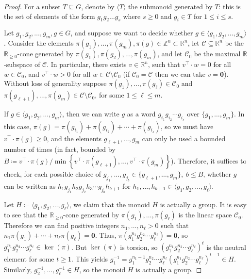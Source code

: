 \documentclass[a4paper,UKenglish,cleveref, autoref, thm-restate]{lipics-v2021}
\newcommand{\Z}{\mathbb{Z}}
\newcommand{\R}{\mathbb{R}}
\newcommand{\mC}{\mathcal{C}}
\newcommand{\bzer}{\boldsymbol{0}}
\newcommand{\gen}[1]{\langle {#1} \rangle}
\theoremstyle{definition}
\theoremstyle{definition}
\theoremstyle{definition}
\begin{document}
\begin{proof}
    For a subset $T \subseteq G$, denote by $\gen{T}$ the submonoid generated by $T$: this is the set of elements of the form $g_1 g_2 \dots g_s$ where $s \geq 0$ and $g_i \in T$ for $1 \leq i \leq s$.
    
    Let $g_1, g_2, \ldots, g_m, g \in G$, and suppose we want to decide whether $g \in \gen{g_1, g_2, \ldots, g_m}$.
    Consider the elements $\pi(g_1), \ldots, \pi(g_m), \pi(g) \in \Z^n \subset \R^n$, let $\mC \subseteq \R^n$ be the $\R_{\geq 0}$-cone generated by $\pi(g_1), \pi(g_2), \ldots, \pi(g_m)$, and let $\mC_0$ be the maximal $\R$-subspace of $\mC$.
    In particular, there exists $v \in \R^n$, such that $v^{\top} \cdot w = 0$ for all $w \in \mC_0$, and $v^{\top} \cdot w > 0$ for all $w \in \mC \setminus \mC_0$ (if $\mC_0 = \mC$ then we can take $v = \bzer$).
    Without loss of generality suppose $\pi(g_1) , \ldots, \pi(g_{\ell}) \in \mC_0$ and $\pi(g_{\ell + 1}) , \ldots, \pi(g_{m}) \in \mC \setminus \mC_0$, for some $1 \leq \ell \leq m$.

    If $g \in \gen{g_1, g_2, \ldots, g_m}$, then we can write $g$ as a word $g_{i_1} g_{i_2} \cdots g_{i_s}$ over $\{g_1, \ldots, g_m\}$. 
    In this case, $\pi(g) = \pi(g_{i_1}) + \pi(g_{i_2}) + \cdots + \pi(g_{i_s})$, so we must have $v^{\top} \cdot \pi(g) \geq 0$, and the elements $g_{\ell + 1}, \ldots, g_m$ can only be used a bounded number of times (in fact, bounded by $B \coloneqq v^{\top} \cdot \pi(g)/ \min\left\{v^{\top} \cdot \pi(g_{\ell + 1}), \ldots, v^{\top} \cdot \pi(g_{m})\right\}$).
    Therefore, it suffices to check, for each possible choice of $g_{j_1}, \ldots, g_{j_b} \in \{g_{\ell + 1}, \ldots, g_m\}, \; b \leq B$, whether $g$ can be written as $h_1 g_{j_1} h_2 g_{j_2} h_3 \cdots g_{j_b} h_{b+1}$ for $h_1, \ldots, h_{b+1} \in \gen{g_1, g_2, \ldots, g_{\ell}}$.
    
    Let $H \coloneqq \gen{g_1, g_2, \ldots, g_{\ell}}$, we claim that the monoid $H$ is actually a group. 
    It is easy to see that the $\R_{\geq 0}$-cone generated by $\pi(g_1) , \ldots, \pi(g_{\ell})$ is the linear space $\mC_0$.
    Therefore we can find positive integers $n_1, \ldots, n_{\ell} > 0$ such that $n_1 \pi(g_1) + \cdots + n_{\ell} \pi(g_{\ell}) = \bzer$. Thus, $\pi(g_1^{n_1} g_2^{n_2} \cdots g_{\ell}^{n_{\ell}}) = \bzer$, so $g_1^{n_1} g_2^{n_2} \cdots g_{\ell}^{n_{\ell}} \in \ker(\pi)$.
    But $\ker(\pi)$ is torsion, so $\left( g_1^{n_1} g_2^{n_2} \cdots g_{\ell}^{n_{\ell}} \right)^t$ is the neutral element for some $t \geq 1$.
    This yields $g_1^{-1} = g_1^{n_1 - 1} g_2^{n_2} \cdots g_{\ell}^{n_{\ell}} \left( g_1^{n_1} g_2^{n_2} \cdots g_{\ell}^{n_{\ell}} \right)^{t-1} \in H$.
    Similarly, $g_2^{-1}, \ldots, g_{\ell}^{-1} \in H$, so the monoid $H$ is actually a group.


\end{proof}
\end{document}
